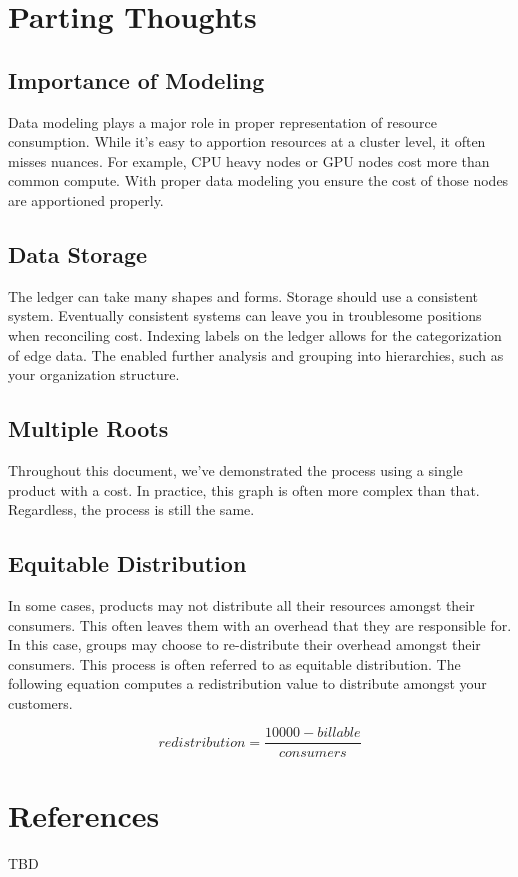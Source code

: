 \documentclass[10pt, a4paper, twocolumn]{article}
\begin{document}
\section*{Parting Thoughts}
  \subsection*{Importance of Modeling}
    Data modeling plays a major role in proper representation of resource consumption.
    While it's easy to apportion resources at a cluster level, it often misses nuances.
    For example, CPU heavy nodes or GPU nodes cost more than common compute.
    With proper data modeling you ensure the cost of those nodes are apportioned properly.

  \subsection*{Data Storage}
    The ledger can take many shapes and forms.
    Storage should use a consistent system.
    Eventually consistent systems can leave you in troublesome positions when reconciling cost.
    Indexing labels on the ledger allows for the categorization of edge data.
    The enabled further analysis and grouping into hierarchies, such as your organization structure.

\subsection*{Multiple Roots}
    Throughout this document, we've demonstrated the process using a single product with a cost.
    In practice, this graph is often more complex than that.
    Regardless, the process is still the same.

  \subsection*{Equitable Distribution}
    In some cases, products may not distribute all their resources amongst their consumers.
    This often leaves them with an overhead that they are responsible for.
    In this case, groups may choose to re-distribute their overhead amongst their consumers.
    This process is often referred to as equitable distribution.
    The following equation computes a redistribution value to distribute amongst your customers.

    \[ redistribution = \frac{10000 - billable}{consumers} \]

\section*{References}
  TBD
\end{document}
